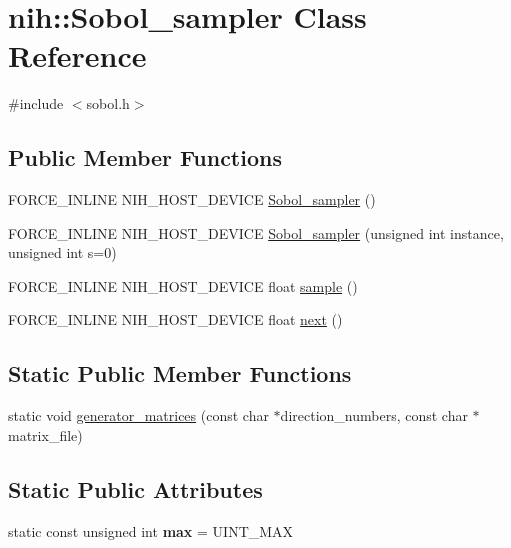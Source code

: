 \hypertarget{classnih_1_1_sobol__sampler}{
\section{nih\-:\-:\-Sobol\-\_\-sampler \-Class \-Reference}
\label{classnih_1_1_sobol__sampler}
}


{\ttfamily \#include $<$sobol.\-h$>$}

\subsection*{\-Public \-Member \-Functions}
\begin{DoxyCompactItemize}
\item 
\-F\-O\-R\-C\-E\-\_\-\-I\-N\-L\-I\-N\-E \-N\-I\-H\-\_\-\-H\-O\-S\-T\-\_\-\-D\-E\-V\-I\-C\-E \hyperlink{classnih_1_1_sobol__sampler_ae85ae0890768f5c68bbccc3e03a8030e}{\-Sobol\-\_\-sampler} ()
\item 
\-F\-O\-R\-C\-E\-\_\-\-I\-N\-L\-I\-N\-E \-N\-I\-H\-\_\-\-H\-O\-S\-T\-\_\-\-D\-E\-V\-I\-C\-E \hyperlink{classnih_1_1_sobol__sampler_a092384171e44310586306f9ab3eb6bd4}{\-Sobol\-\_\-sampler} (unsigned int instance, unsigned int s=0)
\item 
\-F\-O\-R\-C\-E\-\_\-\-I\-N\-L\-I\-N\-E \-N\-I\-H\-\_\-\-H\-O\-S\-T\-\_\-\-D\-E\-V\-I\-C\-E float \hyperlink{classnih_1_1_sobol__sampler_a536af034afaf8959883dead62f862973}{sample} ()
\item 
\-F\-O\-R\-C\-E\-\_\-\-I\-N\-L\-I\-N\-E \-N\-I\-H\-\_\-\-H\-O\-S\-T\-\_\-\-D\-E\-V\-I\-C\-E float \hyperlink{classnih_1_1_sobol__sampler_a4489c6a4fe29833a3591e86dc2c477e5}{next} ()
\end{DoxyCompactItemize}
\subsection*{\-Static \-Public \-Member \-Functions}
\begin{DoxyCompactItemize}
\item 
static void \hyperlink{classnih_1_1_sobol__sampler_a59f0f2ef1de20df8885808483a2703c6}{generator\-\_\-matrices} (const char $\ast$direction\-\_\-numbers, const char $\ast$matrix\-\_\-file)
\end{DoxyCompactItemize}
\subsection*{\-Static \-Public \-Attributes}
\begin{DoxyCompactItemize}
\item 
\hypertarget{classnih_1_1_sobol__sampler_a70a8f1c9f01c06df0fb0b2957bdec8b3}{
static const unsigned int {\bfseries max} = \-U\-I\-N\-T\-\_\-\-M\-A\-X}
\label{classnih_1_1_sobol__sampler_a70a8f1c9f01c06df0fb0b2957bdec8b3}

\end{DoxyCompactItemize}


